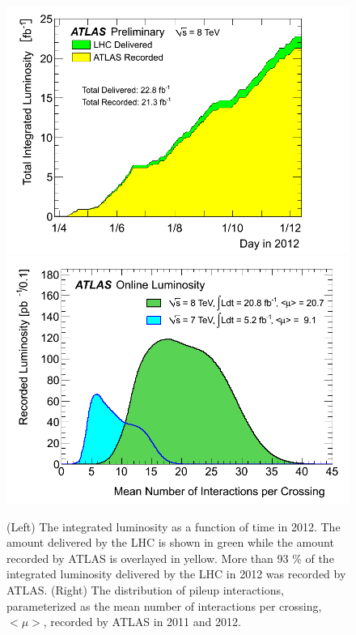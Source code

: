 \begin{figure}[ht]
\centering
\includegraphics[width=.495\textwidth]{figures/lhc/integratedlumi.png}
\includegraphics[width=.495\textwidth]{figures/lhc/pileup.png}
\caption{ (Left) The integrated luminosity as a function of time in 2012. The amount
delivered by the LHC is shown in green while the amount recorded by ATLAS
is overlayed in yellow. More than 93 \% of the integrated luminosity 
delivered by the LHC in 2012 was recorded by ATLAS.  
(Right) The distribution of pileup interactions, parameterized
as the mean number of interactions per crossing, $<\mu>$, 
recorded by ATLAS in 2011 and 2012.  }
\label{fig:lhc_lumi}
\end{figure}

